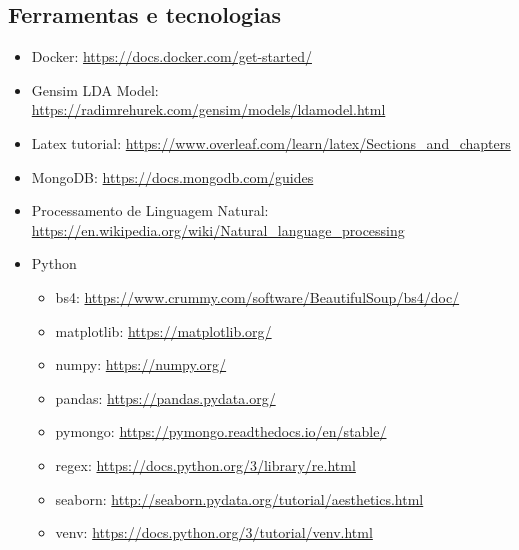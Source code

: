 \subsection{Ferramentas e tecnologias}

\begin{itemize}
    \item Docker: \url{https://docs.docker.com/get-started/}
    \item Gensim LDA Model: \url{https://radimrehurek.com/gensim/models/ldamodel.html}
    \item Latex tutorial: \url{https://www.overleaf.com/learn/latex/Sections\_and\_chapters}
    \item MongoDB: \url{https://docs.mongodb.com/guides}
    \item Processamento de Linguagem Natural: \url{https://en.wikipedia.org/wiki/Natural_language_processing}
    \item Python
    \begin{itemize}
        \item bs4: \url{https://www.crummy.com/software/BeautifulSoup/bs4/doc/}
        \item matplotlib: \url{https://matplotlib.org/}
        \item numpy: \url{https://numpy.org/}
        \item pandas: \url{https://pandas.pydata.org/}
        \item pymongo: \url{https://pymongo.readthedocs.io/en/stable/}
        \item regex: \url{https://docs.python.org/3/library/re.html}
        \item seaborn: \url{http://seaborn.pydata.org/tutorial/aesthetics.html}
        \item venv: \url{https://docs.python.org/3/tutorial/venv.html}
    \end{itemize}
\end{itemize}